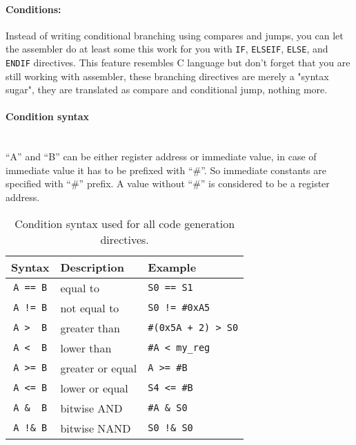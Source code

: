     \paragraph{Conditions:} Instead of writing conditional branching using compares and jumps, you can let the assembler do at least some this work for you with \texttt{IF}, \texttt{ELSEIF}, \texttt{ELSE}, and \texttt{ENDIF} directives. This feature resembles C language but don't forget that you are still working with assembler, these branching directives are merely a "syntax sugar", they are translated as compare and conditional jump, nothing more.

    \paragraph{Condition syntax}
        ~\\``A'' and ``B'' can be either register address or immediate value, in case of immediate value it has to be prefixed with ``\#''. So immediate constants are specified with ``\#'' prefix. A value without ``\#'' is considered to be a register address.

        \begin{table}[h!]
            \centering
            \begin{tabular}{|c|l|l|}
                \hline
                \textbf{Syntax} & \textbf{Description} & \textbf{Example} \\\hline
                \verb'A == B' & equal to         & \verb'S0 == S1' \\
                \verb'A != B' & not equal to     & \verb'S0 != #0xA5' \\
                \verb'A >  B' & greater than     & \verb'#(0x5A + 2) > S0' \\
                \verb'A <  B' & lower than       & \verb'#A < my_reg' \\
                \verb'A >= B' & greater or equal & \verb'A >= #B' \\
                \verb'A <= B' & lower or equal   & \verb'S4 <= #B' \\
                \verb'A &  B' & bitwise AND      & \verb'#A & S0' \\
                \verb'A !& B' & bitwise NAND     & \verb'S0 !& S0' \\\hline
            \end{tabular}
            \caption{Condition syntax used for all code generation directives.}
        \end{table}

